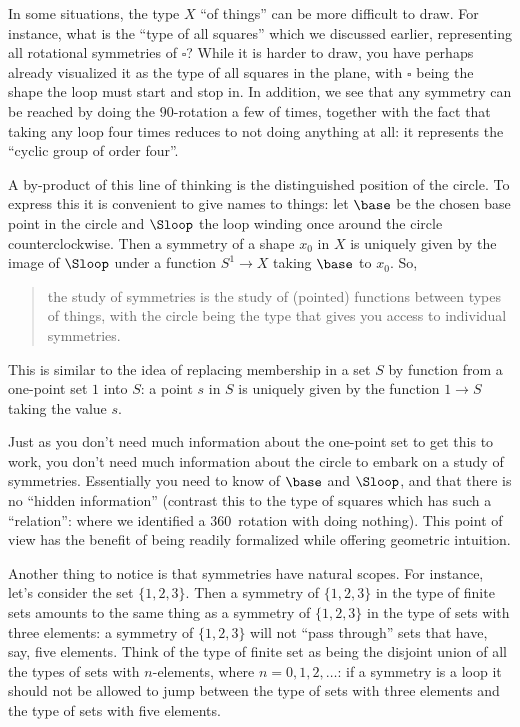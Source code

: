 In some situations, the type $X$ ``of things'' can be more difficult to draw.  For instance, what is the ``type of all squares'' which we discussed earlier, representing all rotational symmetries of $\square$?  While it is harder to draw, you have perhaps already visualized it as the type of all squares in the plane, with $\square$ being the shape the loop must start and stop in.  In addition, we see that any symmetry can be reached by doing the $90$\textdegree-rotation a few of times, together with the fact that taking any loop four times reduces to not doing anything at all: it represents the ``cyclic group of order four''.


A by-product of this line of thinking is the distinguished position of the circle. To express this it is convenient to give names to things: let $\base$ be the chosen base point in the circle and $\Sloop$ the loop winding once around the circle counterclockwise. Then a symmetry of a shape $x_0$ in $X$ is uniquely given by the image of $\Sloop $ under a function $S^1\to X$ taking $\base$ to $x_0$. So,
\begin{quote}
  the study of symmetries is the study of (pointed) functions between types of things, with the circle being the type that gives you access to individual symmetries.
\end{quote}

This is similar to the idea of replacing membership in a set $S$ by function from a one-point set $1$ into $S$: a point $s$ in $S$ is uniquely given by the function $1\to S$ taking the value $s$.


Just as you don't need much information about the one-point set to get this to work, you don't need much information about the circle to embark on a study of symmetries.
Essentially you need to know of $\base $ and $\Sloop $, and that there is no ``hidden information'' (contrast this to the type of squares which has such a ``relation'': where we identified a $360$\textdegree\ rotation with doing nothing).  This point of view has the benefit of being readily formalized while offering geometric intuition.

Another thing to notice is that symmetries have natural scopes. For instance, let's consider the set $\{1,2,3\}$. Then a symmetry of $\{1,2,3\}$ in the type of finite sets amounts to the same thing as a symmetry of $\{1,2,3\}$ in the type of sets with three elements: a symmetry of $\{1,2,3\}$ will not ``pass through'' sets that have, say, five elements. Think of the type of finite set as being the disjoint union of all the types of sets with $n$-elements, where $n=0,1,2,\dots$: if a symmetry is a loop it should not be allowed to jump between the type of sets with three elements and the type of sets with five elements.

